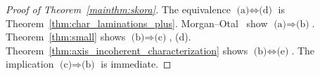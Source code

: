 \begin{proof}[Proof of Theorem~\ref{mainthm:skora}]
The equivalence $\text{(a)} \Leftrightarrow \text{(d)}$ is
Theorem~\ref{thm:char_laminations_plus}.
Morgan--Otal~\cite{MO93:RelativeGrowths} show $\text{(a)} \Rightarrow \text{(b)}$.
Theorem~\ref{thm:small} shows $\text{(b)} \Rightarrow \text{(c)}$, (d).
Theorem~\ref{thm:axis_incoherent_characterization} shows $\text{(b)}
\Leftrightarrow \text{(e)}$. The implication $\text{(c)} \Rightarrow \text{(b)}$ is
immediate.
\end{proof}











